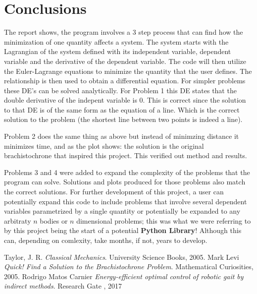 \documentclass[hidelinks, 11pt]{article}
\begin{document}
\section{Conclusions}
The report shows, the program involves a 3 step process that can find how the minimization of one quantity affects a system. 
The system starts with the Lagrangian of the system defined with its independent variable, dependent variable and the derivative of the dependent variable. The code will then utilize the Euler-Lagrange equations to minimize the quantity that the user defines. The relationship is then used to obtain a differential equation. For simpler problems these DE's can be solved analytically. For Problem 1 this DE states that the double derivative of the indepent variable is 0. This is correct since the solution to that DE is of the same form as the equation of a line. Which is the correct solution to the problem (the shortest line between two points is indeed a line). 

Problem 2 does the same thing as above but instead of minimzing distance it minimizes time, and as the plot shows: the solution is the original brachistochrone that inspired this project. This verified out method and results.

Problems 3 and 4 were added to expand the complexity of the problems that the program can solve. Solutions and plots produced for those problems also match the correct solutions. 
For further development of this project, a user can potentially expand this code to include problems that involve several dependent variables parametrized by a single quantity or potentially be expanded to any arbitraty $n$ bodies or $n$ dimensional problems; this was what we were referring to by this project being the start of a potential \textbf{Python Library}! Although this can, depending on comlexity, take months, if not, years to develop.

\begin{thebibliography}{1}

 Taylor, J. R. \textit{Classical
  Mechanics}. University Science Books, 2005. 
 Mark Levi \textit{Quick! Find a Solution to the
Brachistochrone Problem}. Mathematical Curiosities, 2005. 
 Rodrigo Matos Carnier \textit{Energy-efficient optimal control of robotic gait by indirect methods}. Research Gate , 2017

\end{thebibliography}
\end{document}
